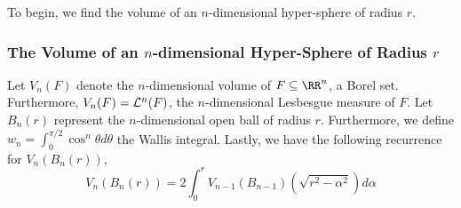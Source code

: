 To begin, we find the volume of an $n$-dimensional hyper-sphere of radius $r$.

\subsubsection{The Volume of an $n$-dimensional Hyper-Sphere of Radius $r$}

Let $V_n(F)$ denote the $n$-dimensional volume of $F\subseteq\RR^n$, a Borel set.
Furthermore, $V_n(F)=\mathcal{L}^n(F)$, the $n$-dimensional Lesbesgue measure of $F$.
Let $B_n(r)$ represent the $n$-dimensional open ball of radius $r$.
Furthermore, we define $w_n=\int_{0}^{\pi/2}\cos^n\theta d\theta$ the Wallis integral.
Lastly, we have the following recurrence for $V_n(B_n(r))$,
\begin{equation}\label{reccing-vol}
	V_n(B_n(r)) = 2\int_{0}^r V_{n-1}(B_{n-1})(\sqrt{r^2-\alpha^2})d\alpha
\end{equation}

